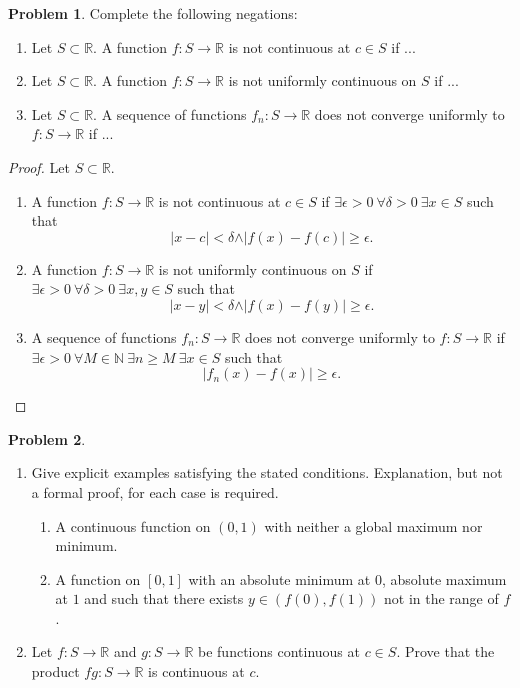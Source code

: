 \documentclass[12pt]{article}
\theoremstyle{definition}
\newtheorem{problem}{Problem}
\begin{document}
\thispagestyle{firstpage}

\begin{problem}
    Complete the following negations:
    \begin{enumerate}[label=(\roman*)]
        \item Let \(S \subset \mathbb{R}\). A function \(f : S \to \mathbb{R}\) is not continuous at \(c \in S\) if ...
        \item Let \(S \subset \mathbb{R}\). A function \(f : S \to \mathbb{R}\) is not uniformly continuous on \(S\) if ...
        \item Let \(S \subset \mathbb{R}\). A sequence of functions \(f_n : S \to \mathbb{R}\) does not converge uniformly to \(f : S \to \mathbb{R}\) if ...
    \end{enumerate}
\end{problem}

\begin{proof}
    Let \(S \subset \mathbb{R}\).
    \begin{enumerate}[label=(\roman*)]
        \item A function \(f : S \to \mathbb{R}\) is not continuous at \(c \in S\) if \(\exists \epsilon > 0 \ \forall \delta > 0 \ \exists x \in S\) such that
        \[
            \vert x - c \vert < \delta \land \vert f(x) - f(c) \vert \geq \epsilon.
        \]
        \item A function \(f : S \to \mathbb{R}\) is not uniformly continuous on \(S\) if \(\exists \epsilon > 0 \ \forall \delta > 0 \ \exists x,y \in S\) such that
        \[
            \vert x - y \vert < \delta \land \vert f(x) - f(y) \vert \geq \epsilon.
        \]
        \item A sequence of functions \(f_n : S \to \mathbb{R}\) does not converge uniformly to \(f : S \to \mathbb{R}\) if \(\exists \epsilon > 0 \ \forall M \in \mathbb{N} \ \exists n \geq M \ \exists x \in S\) such that
        \[
            \vert f_n(x) - f(x) \vert \geq \epsilon. 
        \]
    \end{enumerate}
\end{proof}

\begin{problem}
    \hfill
    \begin{enumerate}[label=(\alph*)]
        \item Give explicit examples satisfying the stated conditions. Explanation, but not a formal proof, for each case is required.
        \begin{enumerate}[label=(\roman*)]
            \item A continuous function on \((0, 1)\) with neither a global maximum nor minimum.
            \item A function on \([0, 1]\) with an absolute minimum at \(0\), absolute maximum at \(1\) and such that there exists \(y \in (f(0),f(1))\) not in the range of \(f\).
        \end{enumerate}
        \item Let \(f : S \to \mathbb{R}\) and \(g : S \to \mathbb{R}\) be functions continuous at \(c \in S\). Prove that the product \(fg : S \to \mathbb{R}\) is continuous at \(c\).
    \end{enumerate}
\end{problem}
\end{document}
